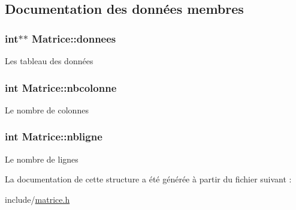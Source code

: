 \subsection{\-Documentation des données membres}
\hypertarget{structMatrice_a4ed59291b88d3ed8b30b3f74d4acf6b3}{
\subsubsection[{donnees}]{\setlength{\rightskip}{0pt plus 5cm}int$\ast$$\ast$ {\bf \-Matrice\-::donnees}}}\label{structMatrice_a4ed59291b88d3ed8b30b3f74d4acf6b3}
\-Les tableau des données \hypertarget{structMatrice_a7bf8157909d60e8ff841b26fc5cb2bab}{
\subsubsection[{nbcolonne}]{\setlength{\rightskip}{0pt plus 5cm}int {\bf \-Matrice\-::nbcolonne}}}\label{structMatrice_a7bf8157909d60e8ff841b26fc5cb2bab}
\-Le nombre de colonnes \hypertarget{structMatrice_a27d7f184cab0fce2a40e173afca96f9f}{
\subsubsection[{nbligne}]{\setlength{\rightskip}{0pt plus 5cm}int {\bf \-Matrice\-::nbligne}}}\label{structMatrice_a27d7f184cab0fce2a40e173afca96f9f}
\-Le nombre de lignes 

\-La documentation de cette structure a été générée à partir du fichier suivant \-:\begin{DoxyCompactItemize}
\item 
include/\hyperlink{matrice_8h}{matrice.\-h}\end{DoxyCompactItemize}

